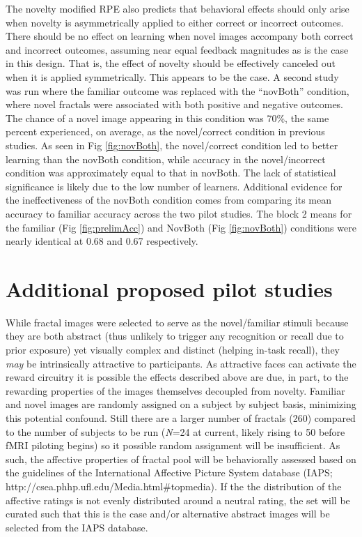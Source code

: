 \documentclass[doc]{apa}        %
\begin{document}
The novelty modified RPE also predicts that behavioral effects should only arise when novelty is asymmetrically applied to either correct or incorrect outcomes.  There should be no effect on learning when novel images accompany both correct and incorrect outcomes, assuming near equal feedback magnitudes as is the case in this design.  That is, the effect of novelty should be effectively canceled out when it is applied symmetrically.  This appears to be the case.  A second study was run where the familiar outcome was replaced with the ``novBoth'' condition, where novel fractals were associated with both positive and negative outcomes.  The chance of a novel image appearing in this condition was 70\%, the same percent experienced, on average, as the novel/correct condition in previous studies.  As seen in Fig \ref{fig:novBoth}, the novel/correct condition led to better learning than the novBoth condition, while accuracy in the novel/incorrect condition was approximately equal to that in novBoth.  The lack of statistical significance is likely due to the low number of learners.  Additional evidence for the ineffectiveness of the novBoth condition comes from comparing its mean accuracy to familiar accuracy across the two pilot studies.  The block 2 means for the familiar (Fig \ref{fig:prelimAcc}) and NovBoth (Fig \ref{fig:novBoth}) conditions were nearly identical at 0.68 and 0.67 respectively.

\section{Additional proposed pilot studies} %
\label{sub:additional_proposed_pilot_studies}
While fractal images were selected to serve as the novel/familiar stimuli because they are both abstract (thus unlikely to trigger any recognition or recall due to prior exposure) yet visually complex and distinct (helping in-task recall), they \emph{may} be intrinsically attractive to participants.  As attractive faces can activate the reward circuitry \cite{Aharon:2001p7277} it is possible the effects described above are due, in part, to the rewarding properties of the images themselves decoupled from novelty.  Familiar and novel images are randomly assigned on a subject by subject basis, minimizing this potential confound.  Still there are a larger number of fractals (260) compared to the number of subjects to be run (\emph{N}=24 at current, likely rising to 50 before fMRI piloting begins) so it possible random assignment will be insufficient.  As such, the affective properties of fractal pool will be behaviorally assessed based on the guidelines of the International Affective Picture System database (IAPS; http://csea.phhp.ufl.edu/Media.html\#topmedia).  If the the distribution of the affective ratings is not evenly distributed around a neutral rating, the set will be curated such that this is the case and/or alternative abstract images will be selected from the IAPS database.
\end{document}
